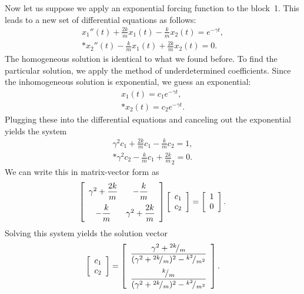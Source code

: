 Now let us suppose we apply an exponential forcing function to the block~1. This leads to a new set of differential equations as follows:
\begin{subequations}
\begin{align}
  x_1''(t) + \frac{2k}{m} x_1(t) -  \frac{k}{m} x_2(t) = e^{-\gamma t}, \\*
  x_2''(t) -  \frac{k}{m} x_1(t) + \frac{2k}{m} x_2(t) = 0.
\end{align}
\end{subequations}
The homogeneous solution is identical to what we found before. To find the particular solution, we apply the method of underdetermined coefficients. Since the inhomogeneous solution is exponential, we guess an exponential:
\begin{subequations}
\begin{align}
  x_1(t) = c_1 e^{-\gamma t}, \\*
  x_2(t) = c_2 e^{-\gamma t}.
\end{align}
\end{subequations}
Plugging these into the differential equations and canceling out the exponential yields the system
\begin{subequations}
\begin{align}
  \gamma^2 c_1 + \frac{2k}{m} c_1 -  \frac{k}{m} c_2 = 1, \\*
  \gamma^2 c_2 - \frac{k}{m}  c_1 + \frac{2k}{m} _2 = 0.
\end{align}
\end{subequations}
We can write this in matrix-vector form as
\begin{align}
  \left[ \begin{array}{c c}
  \gamma^2 + \dfrac{2k}{m} & -\dfrac{k}{m} \vspace{0.2cm} \\
  -\dfrac{k}{m} & \gamma^2 + \dfrac{2k}{m} \\ \end{array} \right]
  \left[ \begin{array}{c} c_1 \\ c_2 \\ \end{array} \right] =
  \left[ \begin{array}{c} 1 \\ 0 \\ \end{array} \right] .
\end{align}
Solving this system yields the solution vector
\begin{align}
  \left[ \begin{array}{c} c_1 \\ c_2 \\ \end{array} \right] =
  \left[ \begin{array}{c} 
  \dfrac{ \gamma^2 + \rfrac{2k}{m} }{ ( \gamma^2 + \rfrac{2k}{m} )^2 - \rfrac{k^2}{m^2} } \vspace{0.2cm} \\* 
  \dfrac{ \rfrac{k}{m} }{ ( \gamma^2 + \rfrac{2k}{m} )^2 - \rfrac{k^2}{m^2} } \\ \end{array} \right] .
\end{align}
